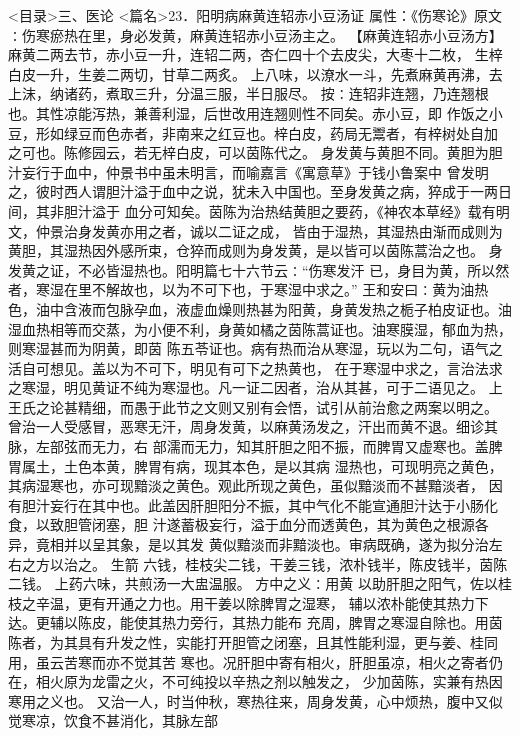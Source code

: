 \documentclass[a4paper,12pt,UTF8,twoside]{ctexbook}
\begin{document}
<目录>三、医论
<篇名>23．阳明病麻黄连轺赤小豆汤证
属性：《伤寒论》原文∶伤寒瘀热在里，身必发黄，麻黄连轺赤小豆汤主之。 
【麻黄连轺赤小豆汤方】麻黄二两去节，赤小豆一升，连轺二两，杏仁四十个去皮尖，大枣十二枚， 
生梓白皮一升，生姜二两切，甘草二两炙。 
上八味，以潦水一斗，先煮麻黄再沸，去上沫，纳诸药，煮取三升，分温三服，半日服尽。 
按∶连轺非连翘，乃连翘根也。其性凉能泻热，兼善利湿，后世改用连翘则性不同矣。赤小豆，即 
作饭之小豆，形如绿豆而色赤者，非南来之红豆也。梓白皮，药局无鬻者，有梓树处自加 
之可也。陈修园云，若无梓白皮，可以茵陈代之。 
身发黄与黄胆不同。黄胆为胆汁妄行于血中，仲景书中虽未明言，而喻嘉言《寓意草》于钱小鲁案中 
曾发明之，彼时西人谓胆汁溢于血中之说，犹未入中国也。至身发黄之病，猝成于一两日间，其非胆汁溢于 
血分可知矣。茵陈为治热结黄胆之要药，《神农本草经》载有明文，仲景治身发黄亦用之者，诚以二证之成， 
皆由于湿热，其湿热由渐而成则为黄胆，其湿热因外感所束，仓猝而成则为身发黄，是以皆可以茵陈蒿治之也。 
身发黄之证，不必皆湿热也。阳明篇七十六节云∶“伤寒发汗 
已，身目为黄，所以然者，寒湿在里不解故也，以为不可下也，于寒湿中求之。” 
王和安曰∶黄为油热色，油中含液而包脉孕血，液虚血燥则热甚为阳黄，身黄发热之栀子柏皮证也。油 
湿血热相等而交蒸，为小便不利，身黄如橘之茵陈蒿证也。油寒膜湿，郁血为热，则寒湿甚而为阴黄，即茵 
陈五苓证也。病有热而治从寒湿，玩以为二句，语气之活自可想见。盖以为不可下，明见有可下之热黄也， 
在于寒湿中求之，言治法求之寒湿，明见黄证不纯为寒湿也。凡一证二因者，治从其甚，可于二语见之。 
上王氏之论甚精细，而愚于此节之文则又别有会悟，试引从前治愈之两案以明之。 
曾治一人受感冒，恶寒无汗，周身发黄，以麻黄汤发之，汗出而黄不退。细诊其脉，左部弦而无力，右 
部濡而无力，知其肝胆之阳不振，而脾胃又虚寒也。盖脾胃属土，土色本黄，脾胃有病，现其本色，是以其病 
湿热也，可现明亮之黄色，其病湿寒也，亦可现黯淡之黄色。观此所现之黄色，虽似黯淡而不甚黯淡者， 
因有胆汁妄行在其中也。此盖因肝胆阳分不振，其中气化不能宣通胆汁达于小肠化食，以致胆管闭塞，胆 
汁遂蓄极妄行，溢于血分而透黄色，其为黄色之根源各异，竟相并以呈其象，是以其发 
黄似黯淡而非黯淡也。审病既确，遂为拟分治左右之方以治之。 
生箭 六钱，桂枝尖二钱，干姜三钱，浓朴钱半，陈皮钱半，茵陈二钱。 
上药六味，共煎汤一大盅温服。 
方中之义∶用黄 以助肝胆之阳气，佐以桂枝之辛温，更有开通之力也。用干姜以除脾胃之湿寒， 
辅以浓朴能使其热力下达。更辅以陈皮，能使其热力旁行，其热力能布 充周，脾胃之寒湿自除也。用茵 
陈者，为其具有升发之性，实能打开胆管之闭塞，且其性能利湿，更与姜、桂同用，虽云苦寒而亦不觉其苦 
寒也。况肝胆中寄有相火，肝胆虽凉，相火之寄者仍在，相火原为龙雷之火，不可纯投以辛热之剂以触发之， 
少加茵陈，实兼有热因寒用之义也。 
又治一人，时当仲秋，寒热往来，周身发黄，心中烦热，腹中又似觉寒凉，饮食不甚消化，其脉左部 
\end{document}
